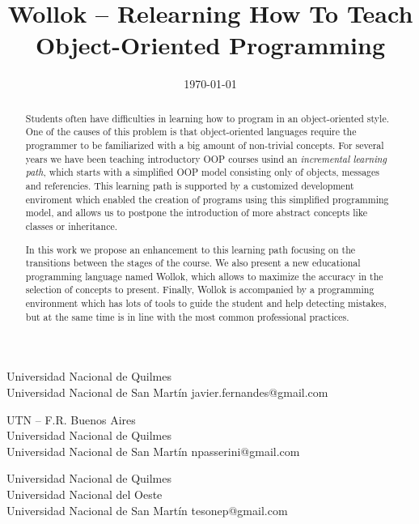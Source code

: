 \documentclass[preprint,10pt,nocopyrightspace]{sigplanconf}
\begin{document}
\title{Wollok -- Relearning How To Teach Object-Oriented Programming}
  {Universidad Nacional de Quilmes \\ Universidad Nacional de San Martín}
  {javier.fernandes@gmail.com}
  
  {UTN -- F.R. Buenos Aires \\ Universidad Nacional de Quilmes \\ Universidad Nacional de San Martín}
  {npasserini@gmail.com}
  
  {Universidad Nacional de Quilmes \\ Universidad Nacional del Oeste \\ Universidad Nacional de San Martín}
  {tesonep@gmail.com}

\date{\today}
\maketitle

\begin{abstract}
Students often have difficulties in learning how to program in an object-oriented style.
One of the causes of this problem is that object-oriented languages require the programmer to be familiarized with a big amount of non-trivial concepts.
For several years we have been teaching introductory OOP courses usind an \emph{incremental learning path}, 
which starts with a simplified OOP model consisting only of objects, messages and referencies.
This learning path is supported by a customized development enviroment which enabled the creation of programs using this {simplified programming model},
and allows us to postpone the introduction of more abstract concepts like classes or inheritance.

In this work we propose an enhancement to this learning path focusing on the transitions between the stages of the course.
We also present a new educational programming language named Wollok, which allows to maximize the accuracy in the selection of concepts to present.
Finally, Wollok is accompanied by a programming environment which has lots of tools to guide the student and help detecting mistakes, 
but at the same time is in line with the most common professional practices.
\end{abstract}







\end{document}

